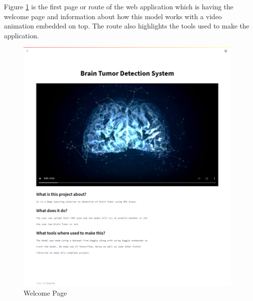 Figure \ref{fig:page1} is the first page or route of the web application which is having the welcome page and information about how this model works with a video animation embedded on top. The route also highlights the tools used to make the application.
\begin{figure}[H]
\includegraphics[scale=0.3]{Photos/Page1.png}
\caption{Welcome Page} \label{fig:page1}
\end{figure}


